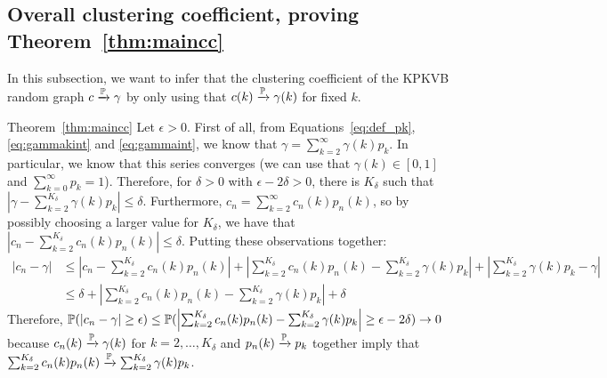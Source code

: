 \subsection{Overall clustering coefficient, proving Theorem~\ref{thm:maincc}}
In this subsection, we want to infer that the clustering coefficient of the KPKVB random graph $c \xrightarrow{\mathbb{P}} \gamma$ by only using that $c(k) \xrightarrow{\mathbb{P}} \gamma(k)$ for fixed $k$.

\begin{proofof}{Theorem~\ref{thm:maincc}}
Let $\epsilon >0$.
First of all, from Equations~\ref{eq:def_pk}, \ref{eq:gammakint} and \ref{eq:gammaint}, we know that $\gamma = \sum_{k=2}^\infty \gamma(k)p_k$. In particular, we know that this series converges (we can use that $\gamma(k)\in [0,1]$ and $\sum_{k=0}^\infty p_k = 1$). Therefore, for $\delta >0$ with $\epsilon-2\delta>0$, there is $K_\delta$ such that $|\gamma - \sum_{k=2}^{K_\delta} \gamma(k)p_k| \leq \delta$. Furthermore, $c_n = \sum_{k=2}^\infty c_n(k)p_n(k)$, so by possibly choosing a larger value for $K_\delta$, we have that $|c_n-\sum_{k=2}^{K_\delta} c_n(k)p_n(k)| \leq \delta$.
Putting these observations together:
\begin{align*}
|c_n-\gamma| &\leq \left|c_n-\sum_{k=2}^{K_\delta}c_n(k)p_n(k)\right|+\left|\sum_{k=2}^{K_\delta} c_n(k)p_n(k) -\sum_{k=2}^{K_\delta} \gamma(k)p_k\right| +\left|\sum_{k=2}^{K_\delta} \gamma(k)p_k-\gamma\right| \\
 &\leq \delta +\left|\sum_{k=2}^{K_\delta} c_n(k)p_n(k) -\sum_{k=2}^{K_\delta} \gamma(k)p_k\right| +\delta 
\end{align*}
Therefore, $\mathbb{P}(|c_n-\gamma|\geq \epsilon) \leq \mathbb{P}(\left|\sum_{k=2}^{K_\delta} c_n(k)p_n(k) -\sum_{k=2}^{K_\delta} \gamma(k)p_k\right| \geq \epsilon - 2\delta) \rightarrow 0$ because $c_n(k) \xrightarrow{\mathbb{P}} \gamma(k)$ for $k=2,\dots,K_\delta$ and $p_n(k) \xrightarrow{\mathbb{P}} p_k$ together imply that $\sum_{k=2}^{K_\delta} c_n(k)p_n(k) \xrightarrow{\mathbb{P}} \sum_{k=2}^{K_\delta} \gamma(k) p_k$. %
\end{proofof}



